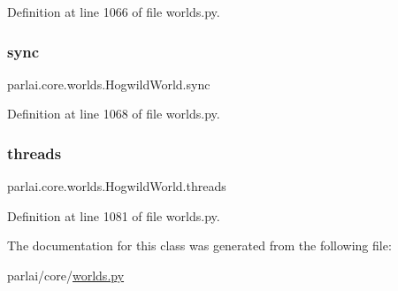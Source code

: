 Definition at line 1066 of file worlds.\+py.

\mbox{\label{classparlai_1_1core_1_1worlds_1_1HogwildWorld_abe0b40ea70c93221f9f2541cb6089c60}} 
\subsubsection{\texorpdfstring{sync}{sync}}
{\footnotesize\ttfamily parlai.\+core.\+worlds.\+Hogwild\+World.\+sync}



Definition at line 1068 of file worlds.\+py.

\mbox{\label{classparlai_1_1core_1_1worlds_1_1HogwildWorld_a16d58ef1f8d81bae98e7f99e268ef9b4}} 
\subsubsection{\texorpdfstring{threads}{threads}}
{\footnotesize\ttfamily parlai.\+core.\+worlds.\+Hogwild\+World.\+threads}



Definition at line 1081 of file worlds.\+py.



The documentation for this class was generated from the following file\+:\begin{DoxyCompactItemize}
\item 
parlai/core/\hyperlink{parlai_2core_2worlds_8py}{worlds.\+py}\end{DoxyCompactItemize}
